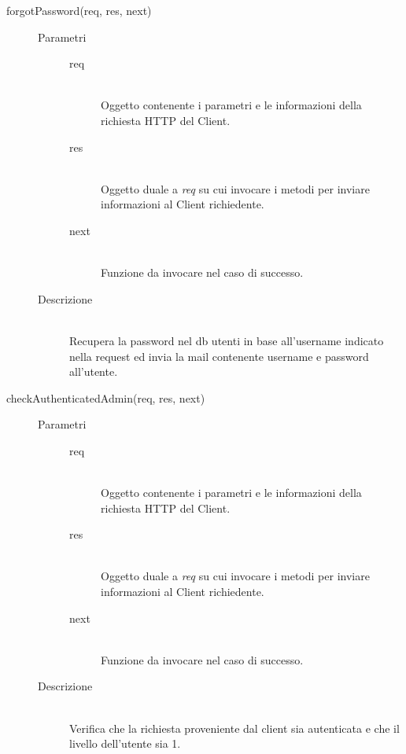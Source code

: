\begin{description}
\begin{description}
     \item[forgotPassword(req, res, next)] \hfill 
     \begin{description}
     \item[Parametri] \hfill
     \begin{description}
     \item[req] \hfill \\
     	         Oggetto contenente i parametri e le informazioni della richiesta HTTP del Client.
     	         \item[res] \hfill \\
     	         Oggetto duale a \textit{req} su cui invocare i metodi per inviare informazioni al Client richiedente.
                  \item[next] \hfill \\
                  Funzione da invocare nel caso di successo.
     \end{description}
     \item[Descrizione] \hfill \\
     Recupera la password nel db utenti in base all'username indicato nella request ed invia la mail contenente username e password all'utente.
     \end{description}
                        
     \item[checkAuthenticatedAdmin(req, res, next)] \hfill 
          \begin{description}
            \item[Parametri] \hfill
            \begin{description}
             \item[req] \hfill \\
	         Oggetto contenente i parametri e le informazioni della richiesta HTTP del Client.
	         \item[res] \hfill \\
	         Oggetto duale a \textit{req} su cui invocare i metodi per inviare informazioni al Client richiedente.
             \item[next] \hfill \\
             Funzione da invocare nel caso di successo.
            \end{description}
            \item[Descrizione] \hfill \\
            Verifica che la richiesta proveniente dal client sia autenticata e che il livello dell'utente sia 1. 
         \end{description}
    

\end{description}
\end{description}
